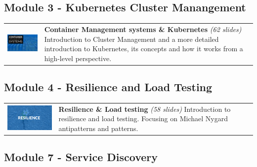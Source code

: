 \subsection*{Module 3 - Kubernetes Cluster Manangement}
\renewcommand*{\arraystretch}{2}
\begin{tabular}{p{6cm}p{7.5cm}}

\includegraphics[align=t,width=6cm]{figures/slides/slides_w3_container_management_systems} & \textbf{Container Management systems \& Kubernetes} \newline \textit{(62 slides)} \newline Introduction to Cluster Management and a more detailed introduction to Kubernetes, its concepts and how it works from a high-level perspective. \\ 

\end{tabular}

\subsection*{Module 4 - Resilience and Load Testing}
\renewcommand*{\arraystretch}{2}
\begin{tabular}{p{6cm}p{7.5cm}}

\includegraphics[align=t,width=6cm]{figures/slides/slides_w4_resilience} & \textbf{Resilience \& Load testing} \newline \textit{(58 slides)} \newline Introduction to resilience and load testing. Focusing on Michael Nygard antipatterns and patterns.\\ 

\end{tabular}

\subsection*{Module 7 - Service Discovery}

